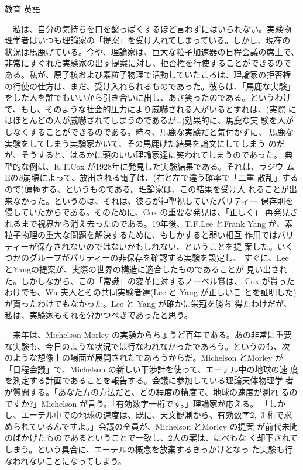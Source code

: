 \documentclass[fleqn]{jbook}
\begin{document}
\begin{answer}{教育 英語}{}
\begin{subanswers}
　私は、自分の気持ちを口を酸っぱくするほど言わずにはいられない。実験物
理学者はいつも理論家の「提案」を受け入れてしまっている。しかし、現在の
状況は馬鹿げている。今や、理論家は、巨大な粒子加速器の日程会議の席上で、
非常にすぐれた実験家の出す提案に対し、拒否権を行使することができるので
ある。私が、原子核および素粒子物理で活動していたころは、理論家の拒否権
の行使の仕方は、まだ、受け入れられるものであった。彼らは、「馬鹿な実験」
をした人を誰でもいいから引き合いに出し、あざ笑ったのである。というわけ
で、もし、そのような社会的圧力により威嚇される人がいるとすれは、(実際
にはほとんどの人が威嚇されてしまうのであるが\ldots )効果的に、馬鹿な実
験を人がしなくすることができるのである。時々、馬鹿な実験だと気付かずに、
馬鹿な実験をしてしまう実験家がいて、その馬鹿げた結果を論文にしてしまう
のだが、そうすると、はるかに頭のいい理論家達に笑われてしまうのであった。
典型的な例は、R.T.Cox が1928年に発見した実験結果である。それは、ラジウ
ムEの$\beta$崩壊によって、放出される電子は、(右と左で違う確率で「二重
散乱」するので)偏極する、というものである。理論家は、この結果を受け入
れることが出来なかった。というのは、それは、彼らが神聖視していたパリティー
保存則を侵していたからである。そのために、Cox の重要な発見は、「正しく」
再発見されるまで視界から消え去ったのである。19年後、T.F.Lee とFrank
Yang が、素粒子物理の重大な問題を解決するために、もしかすると弱い相互
作用ではパリティーが保存されないのではないかもしれない、ということを提
案した。いくつかのグループがパリティーの非保存を確認する実験を設定し、
すぐに、Lee とYangの提案が、実際の世界の構造に適合したものであることが
見い出された。しかしながら、この「常識」の変革に対するノーベル賞は、
Cox が貰ったわけでも、Wu 夫人とその共同実験者達(Lee と Yang が正しいこ
とを証明した)が貰ったわけでもなかった。Lee と Yang が確かに栄冠を勝ち
得たわけだが、私は、実験家もそれを分かつべきであったと思う。

　来年は、Michelson-Morley の実験からちょうど百年である。あの非常に重要
な実験も、今日のような状況では行なわれなかったであろう。というのも、次
のような想像上の場面が展開されたであろうからだ。Michelson とMorley が
「日程会議」で、Michelson の新しい干渉計を使って、エーテル中の地球の速
度を測定する計画であることを報告する。会議に参加している理論天体物理学
者が質問する。「あなた方の方法だと、どの程度の精度で、地球の速度が測れ
るのですか?」Michelson が言う。「有効数字一桁です。」理論家が応える。
「しかし、エーテル中での地球の速度は、既に、天文観測から、有効数字2,~3
桁で求められているんですよ。」会議の全員が、Michelson とMorley の提案
が前代未聞のばかげたものであるということで一致し、2人の案は、にべもな
く却下されてしまう。という具合に、エーテルの概念を放棄するきっかけとなっ
た実験も行なわれないことになってしまう。


\end{subanswers}
\end{answer}
\end{document}
